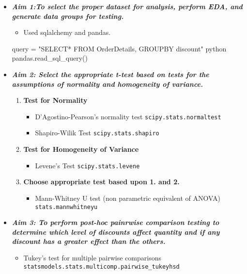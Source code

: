 \documentclass[11pt]{article}
\providecommand{\tightlist}{%
      \setlength{\itemsep}{0pt}\setlength{\parskip}{0pt}}
\newenvironment{Shaded}{}{}
\newcommand{\StringTok}[1]{\textcolor[rgb]{0.25,0.44,0.63}{{#1}}}
\newcommand{\NormalTok}[1]{{#1}}
\newcommand{\OperatorTok}[1]{\textcolor[rgb]{0.40,0.40,0.40}{{#1}}}
\begin{document}
\begin{itemize}
\tightlist
\item
  \textbf{\emph{Aim 1:To select the proper dataset for analysis, perform
  EDA, and generate data groups for testing.}}

  \begin{itemize}
  \tightlist
  \item
    Used sqlalchemy and pandas.
  \end{itemize}

\begin{Shaded}
\begin{Highlighting}[]
\NormalTok{query }\OperatorTok{=} \StringTok{"SELECT* FROM OrderDetails, GROUPBY discount"}
\NormalTok{python pandas.read_sql_query()}
\end{Highlighting}
\end{Shaded}
\item
  \textbf{\emph{Aim 2: Select the appropriate t-test based on tests for
  the assumptions of normality and homogeneity of variance.}}

  \begin{enumerate}
  \def\labelenumi{\arabic{enumi}.}
  \tightlist
  \item
    \textbf{Test for Normality}

    \begin{itemize}
    \tightlist
    \item
      D'Agostino-Pearson's normality test
      \texttt{scipy.stats.normaltest}
    \item
      Shapiro-Wilik Test \texttt{scipy.stats.shapiro}
    \end{itemize}
  \item
    \textbf{Test for Homogeneity of Variance}

    \begin{itemize}
    \tightlist
    \item
      Levene's Test \texttt{scipy.stats.levene}
    \end{itemize}
  \item
    \textbf{Choose appropriate test based upon 1. and 2.}

    \begin{itemize}
    \tightlist
    \item
      Mann-Whitney U test (non parametric equivalent of ANOVA)
      \texttt{stats.mannwhitneyu}
    \end{itemize}
  \end{enumerate}
\item
  \textbf{\emph{Aim 3: To perform post-hoc painrwise comparison testing
  to determine which level of discounts affect quantity and if any
  discount has a greater effect than the others.}}

  \begin{itemize}
  \tightlist
  \item
    Tukey's test for multiple pairwise comparisons
    \texttt{statsmodels.stats.multicomp.pairwise\_tukeyhsd}
  \end{itemize}
\end{itemize}
\end{document}
